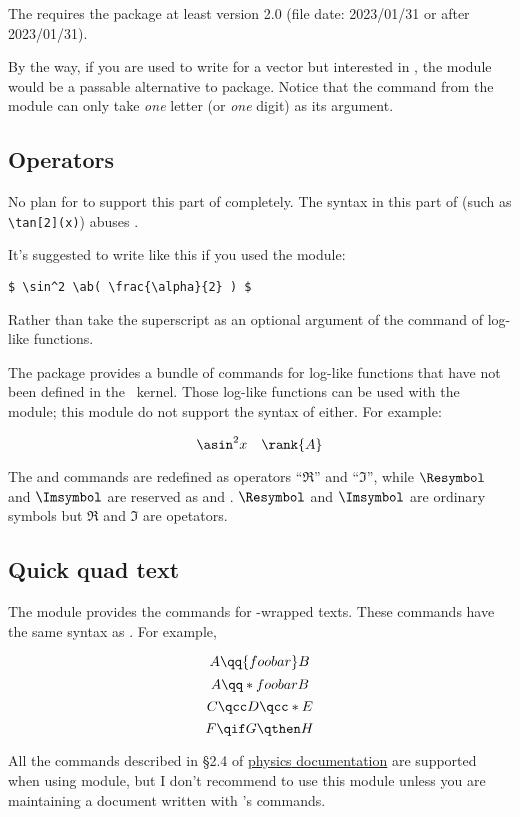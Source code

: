 \documentclass[11pt,letterpaper]{article}
\begin{document}
The  requires the  package at least
version 2.0 (file date: 2023/01/31 or after 2023/01/31).

By the way, if you are used to write  for a vector but interested in
, the  module would be a passable
alternative to  package. Notice that the  command from the
 module can only take \emph{one} letter (or \emph{one} digit)
as its argument.

\subsection{Operators}
No plan for  to support this part of  completely.
The syntax in this part of  (such as \verb|\tan[2](x)|) abuses
.

It's suggested to write like this if you used the  module:
\begin{Verbatim}[fontsize=\small]
$ \sin^2 \ab( \frac{\alpha}{2} ) $
\end{Verbatim}
Rather than take the superscript as an optional argument of the command of
log-like functions.

The  package provides a bundle of commands for log-like functions
that have not been defined in the \LaTeXe\ kernel. Those log-like functions
can be used with the  module; this module do not support
the syntax of  either. For example:
\begin{example}
\[ \asin^2 x \quad \rank \{ A \} \]
\end{example}
The  and  commands are redefined as operators ``$\Re$'' and
``$\Im$'', while $\Resymbol$ and $\Imsymbol$ are reserved as  and
. $\Resymbol$ and $\Imsymbol$ are ordinary symbols but $\Re$ and
$\Im$ are opetators.

\subsection{Quick quad text}
The  module provides the  commands
for -wrapped texts. These commands have the same syntax as
. For example,
\begin{example}
\[ A \qq {foo bar} B \]
\[ A \qq*{foo bar} B \]
\[ C \qcc D \qcc*  E \]
\[ F \qif G \qthen H \]
\end{example}
All the commands described in \S2.4 of
\hyperref{http://mirrors.ctan.org/macros/latex/contrib/physics/physics.pdf}{}{}%
{\textsf{physics} documentation} are supported when using 
module, but I don't recommend to use this module unless you are maintaining a
document written with 's  commands.
\end{document}
